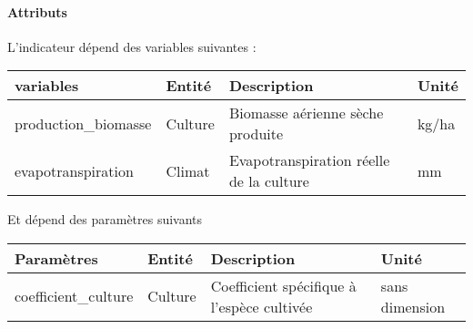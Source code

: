 \documentclass[
]{article}
\begin{document}
\paragraph{Attributs}\label{attributs-30}

L'indicateur dépend des variables suivantes :

\begin{longtable}[]{@{}
  >{\raggedright\arraybackslash}p{}
  >{\raggedright\arraybackslash}p{}
  >{\raggedright\arraybackslash}p{}
  >{\raggedright\arraybackslash}p{}@{}}
\toprule\noalign{}
\begin{minipage}[b]{\linewidth}\raggedright
\textbf{variables}
\end{minipage} & \begin{minipage}[b]{\linewidth}\raggedright
\textbf{Entité}
\end{minipage} & \begin{minipage}[b]{\linewidth}\raggedright
\textbf{Description}
\end{minipage} & \begin{minipage}[b]{\linewidth}\raggedright
\textbf{Unité}
\end{minipage} \\
\midrule\noalign{}
\endhead
\bottomrule\noalign{}
\endlastfoot
production\_biomasse & Culture & Biomasse aérienne sèche produite &
kg/ha \\
evapotranspiration & Climat & Evapotranspiration réelle de la culture &
mm \\
\end{longtable}

Et dépend des paramètres suivants

\begin{longtable}[]{@{}
  >{\raggedright\arraybackslash}p{}
  >{\raggedright\arraybackslash}p{}
  >{\raggedright\arraybackslash}p{}
  >{\raggedright\arraybackslash}p{}@{}}
\toprule\noalign{}
\begin{minipage}[b]{\linewidth}\raggedright
\textbf{Paramètres}
\end{minipage} & \begin{minipage}[b]{\linewidth}\raggedright
\textbf{Entité}
\end{minipage} & \begin{minipage}[b]{\linewidth}\raggedright
\textbf{Description}
\end{minipage} & \begin{minipage}[b]{\linewidth}\raggedright
\textbf{Unité}
\end{minipage} \\
\midrule\noalign{}
\endhead
\bottomrule\noalign{}
\endlastfoot
coefficient\_culture & Culture & Coefficient spécifique à l'espèce
cultivée & sans dimension \\
\end{longtable}
\end{document}
